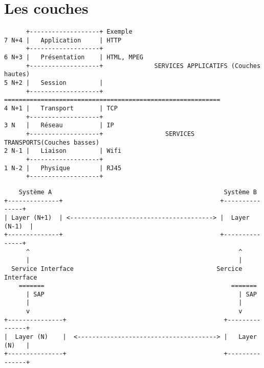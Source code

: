 \documentclass[12pt,a4paper,openany]{book}
\begin{document}
	\section{Les couches}
\begin{verbatim}
      +-------------------+ Exemple  
7 N+4 |   Application     | HTTP   
      +-------------------+     
6 N+3 |   Présentation    | HTML, MPEG     
      +-------------------+              SERVICES APPLICATIFS (Couches hautes)
5 N+2 |   Session         |   
      +-------------------+ ===========================================================
4 N+1 |   Transport       | TCP 
      +-------------------+    
3 N   |   Réseau          | IP    
      +-------------------+                 SERVICES TRANSPORTS(Couches basses)
2 N-1 |   Liaison         | Wifi    
      +-------------------+    
1 N-2 |   Physique        | RJ45  
      +-------------------+  
\end{verbatim}
\begin{verbatim}
	Système A                                               Système B
+--------------+                                           +---------------+
| Layer (N+1)  | <---------------------------------------> |  Layer (N-1)  |
+--------------+                                           +---------------+       
      ^                                                         ^
      |                                                         | 
  Service Interface                                       Sercice Interface
    =======                                                   =======
      | SAP                                                     | SAP
      |                                                         | 
      v                                                         v
+---------------+	                                        +---------------+	   
|  Layer (N)    |  <--------------------------------------> |   Layer (N)   |
+---------------+	                                        +---------------+
\end{verbatim}
\newpage
\end{document}
